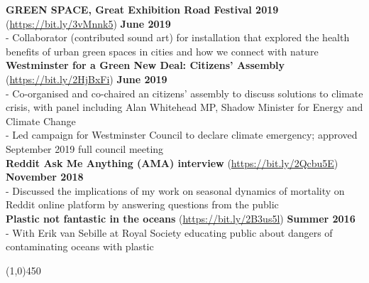 \noindent \textbf{GREEN SPACE, Great Exhibition Road Festival 2019} (\href{https://bit.ly/3vMnnk5}{https://bit.ly/3vMnnk5}) \hfill \textbf{June 2019}\\
\noindent - Collaborator (contributed sound art) for installation that explored the health benefits of urban green spaces in cities and how we connect with nature\\

\noindent \textbf{Westminster for a Green New Deal: Citizens' Assembly} 
(\href{https://bit.ly/2HjBxFi}{https://bit.ly/2HjBxFi}) \hfill \textbf{June 2019}\\
\noindent - Co-organised and co-chaired an citizens' assembly to discuss solutions to climate crisis, with panel including Alan Whitehead MP, Shadow Minister for Energy and Climate Change\\
- Led campaign for Westminster Council to declare climate emergency;  approved September 2019 full council meeting\\

\noindent \textbf{Reddit Ask Me Anything (AMA) interview} (\href{https://bit.ly/2Qcbu5E}{https://bit.ly/2Qcbu5E}) \hfill \textbf{November 2018}	\\
\noindent - Discussed  the implications of my work on seasonal dynamics of mortality on Reddit online platform by answering questions from the public\\


\noindent \textbf{Plastic not fantastic in the oceans} (\href{https://bit.ly/2B3us5l}{https://bit.ly/2B3us5l}) \hfill \textbf{Summer 2016}							\\
- With Erik van Sebille at Royal Society educating public about dangers of contaminating oceans with plastic

\begin{center} \line(1,0){450} \end{center}